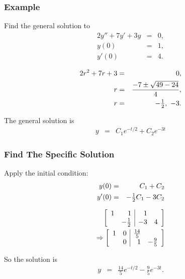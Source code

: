 \begin{frame}
  \frametitle{Example}

  Find the general solution to
  \begin{eqnarray*}
    2y'' + 7y' + 3y & = & 0, \\
    y(0) & = & 1, \\
    y'(0) & = & 4.
  \end{eqnarray*}

  {
    \begin{eqnarray*}
      2r^2 + 7r + 3 & = & 0, \\
      r & = & \frac{-7\pm\sqrt{49-24}}{4}, \\
      r & = & -\mbox{$\frac{1}{2}$},~-3.
    \end{eqnarray*}

    The general solution is
    \begin{eqnarray*}
      y & = & C_1 e^{-t/2} + C_2 e^{-3t}
    \end{eqnarray*}

  }
  

\end{frame}


\begin{frame}
  \frametitle{Find The Specific Solution}

  Apply the initial condition:
  \begin{eqnarray*}
    y(0) & = & C_1 + C_2 \\
    y'(0) & = & -\mbox{$\frac{1}{2}$} C_1 - 3 C_2
  \end{eqnarray*}

  \begin{eqnarray*}
    \left[ \begin{array}{rr|rr}
    1 & 1 & 1 & \\ & -\mbox{$\frac{1}{2}$} & -3 & 4 \\ 
    \end{array} \right] \\
    \Rightarrow
    \left[ \begin{array}{rr|rr}
    1 & 0 & \frac{14}{5} & \\ & 0 & 1 & -\frac{9}{5} \\ 
    \end{array} \right]
  \end{eqnarray*}

  So the solution is
  \begin{eqnarray*}
    y & = & \frac{14}{5} e^{-t/2} - \frac{9}{5} e^{-3t}.
  \end{eqnarray*}
  

\end{frame}



